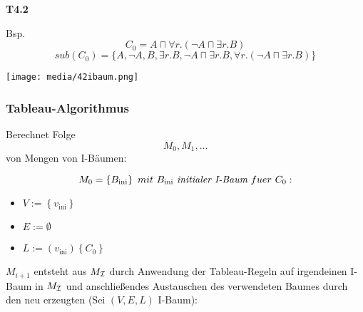 \textbf{T4.2}

Bsp. $$C_0 = A \sqcap \forall r.(\neg A \sqcap \exists r.B)$$
$$sub(C_0) = \{A, \neg A, B, \exists r.B, \neg A \sqcap \exists r.B, \forall r.(\neg A \sqcap \exists r.B)\}$$

\texttt{[image: media/42ibaum.png]}

\subsubsection{Tableau-Algorithmus}\label{tableau-algorithmus}

Berechnet Folge $$M_{0},M_1,\ldots$$ von Mengen von I-Bäumen:

$$M_{0} = \left\{ B_{\text{ini}} \right\}\ mit\ B_{\text{ini}}\ \emph{initialer I-Baum}\ fuer\ C_{0}:$$

\begin{itemize}
\item
  $V := \left\{ v_{\text{ini}} \right\}$
\item
  $E := \emptyset$
\item
  $L := \left( v_{\text{ini}} \right) \left\{ C_{0} \right\}$
\end{itemize}

$M_{i + 1}$ entsteht aus $M_{\mathcal{I}}$ durch Anwendung der Tableau-Regeln
auf irgendeinen I-Baum in $M_{\mathcal{I}}$ und anschließendes Austauschen des
verwendeten Baumes durch den neu erzeugten (Sei $\left( V,E,L \right)$
I-Baum):


